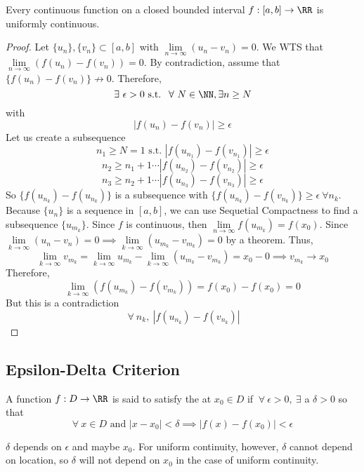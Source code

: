 \documentclass[12pt]{scrartcl}
\newcommand{\Lim}{\underset{n\to\infty}{\lim}}
\begin{document}
\begin{theorem}
  Every continuous function on a closed bounded interval $f: [a,b] \to \RR$ is uniformly continuous.
  \begin{proof}
    Let $\{u_n\}, \{v_n\} \subset [a,b]$ with $\Lim (u_n - v_n)= 0$. We WTS that 
    $\Lim (f(u_n) - f(v_n)) = 0$. By contradiction, assume that $\{f(u_n) - f(v_n)\} \not \to 0$. 
    Therefore, 
    \[\exists \ \epsilon > 0 \text{ s.t. } \ \forall \ N \in \NN, \exists n \geq N\] with 
    \[|f(u_n) - f(v_n)| \geq \epsilon\]
    Let us create a subsequence
    \[n_1 \geq N = 1 \text{ s.t. } |f(u_{n_1}) - f(v_{n_1})| \geq \epsilon\]
    \[n_2 \geq n_1 + 1 \cdots |f(u_{n_2}) - f(v_{n_2})| \geq \epsilon\]
    \[n_3 \geq n_2 + 1 \cdots |f(u_{n_3}) - f(v_{n_3})| \geq \epsilon\]
    So $\{f(u_{n_k}) - f(u_{n_k})\}$ is a subsequence with 
    $\{f(u_{n_k}) - f(v_{n_k})\} \geq \epsilon \ \forall n_k$. Because $\{u_n\}$ is a 
    sequence in $[a, b]$, we can use Sequetial Compactness to find a subsequence 
    $\{u_{m_k}\}$. Since $f$ is continuous, then $\Lim f(u_{m_k}) = f(x_0)$.
    Since $\underset{k\to\infty}{\lim}(u_n - v_n) = 0 \implies \underset{k\to\infty}{\lim}(u_{m_k} - v_{m_k}) = 0$
    by a theorem. Thus, 
    \[\lim_{k\to\infty} v_{m_k} = \lim_{k\to\infty}u_{m_k} - \lim_{k\to\infty}(u_{m_k} - v_{m_k}) = x_0 - 0 \implies v_{m_k} \to x_0\]
    Therefore, 
    \[\lim_{k\to\infty}(f(u_{m_k}) - f(v_{m_k})) = f(x_0) - f(x_0) = 0\]
    But this is a contradiction 
    \[\ \forall \ n_k, \ |f(u_{n_k}) - f(v_{n_k})|\]
  \end{proof}
\end{theorem}

\subsection{Epsilon-Delta Criterion}

\begin{definition}
  A function $f: D \to\RR$ is said to satisfy the  at $x_0 \in D$ 
  if $\ \forall \ \epsilon > 0, \ \exists$ a $\delta > 0$ so that 
  \[\forall \ x \in D \text{ and } |x-x_0| < \delta \implies |f(x) - f(x_0)| < \epsilon\]
\end{definition}

\begin{note}
  $\delta$ depends on $\epsilon$ and maybe $x_0$. For uniform continuity, however, $\delta$ 
  cannot depend on location, so $\delta$ will not depend on $x_0$ in the case of 
  uniform continuity.
\end{note}
\end{document}
